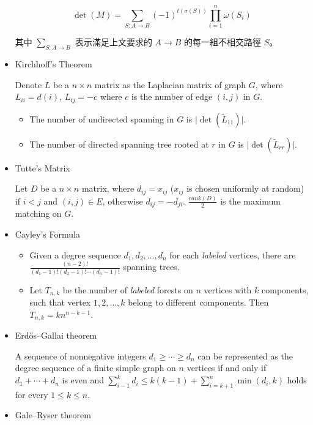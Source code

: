 \begin{itemize}
$$
\det(M)=\sum\limits_{S:A\rightarrow B}(-1)^{t(\sigma(S))}\prod\limits_{i=1}^n \omega(S_i)
$$

其中 $\sum\limits_{S:A\rightarrow B}$ 表示滿足上文要求的 $A\rightarrow B$ 的每一組不相交路徑 $S$。

\item Kirchhoff's Theorem

Denote $L$ be a $n \times n$ matrix as the Laplacian matrix of graph $G$, where $L_{ii} = d(i)$, $L_{ij} = -c$ where $c$ is the number of edge $(i, j)$ in $G$.
\begin{itemize}
    \itemsep-0.5em
    \item The number of undirected spanning in $G$ is $\lvert \det(\tilde{L}_{11}) \rvert$.
    \item The number of directed spanning tree rooted at $r$ in $G$ is $\lvert \det(\tilde{L}_{rr}) \rvert$.
\end{itemize}

\item Tutte's Matrix

Let $D$ be a $n \times n$ matrix, where $d_{ij} = x_{ij}$ ($x_{ij}$ is chosen uniformly at random) if $i < j$ and $(i, j) \in E$, otherwise $d_{ij} = -d_{ji}$. $\frac{rank(D)}{2}$ is the maximum matching on $G$.

\item Cayley's Formula

\begin{itemize}
    \itemsep-0.5em
  \item Given a degree sequence $d_1, d_2, \ldots, d_n$ for each \textit{labeled} vertices, there are $\frac{(n - 2)!}{(d_1 - 1)!(d_2 - 1)!\cdots(d_n - 1)!}$ spanning trees.
  \item Let $T_{n, k}$ be the number of \textit{labeled} forests on $n$ vertices with $k$ components, such that vertex $1, 2, \ldots, k$ belong to different components. Then $T_{n, k} = kn^{n - k - 1}$.
\end{itemize}

\item Erdős–Gallai theorem 

A sequence of nonnegative integers $d_1\ge\cdots\ge d_n$ can be represented as the degree sequence of a finite simple graph on $n$ vertices if and only if $d_1+\cdots+d_n$ is even and $\displaystyle\sum_{i-1}^kd_i\le k(k-1)+\displaystyle\sum_{i=k+1}^n\min(d_i,k)$ holds for every $1\le k\le n$.

\item Gale–Ryser theorem


\end{itemize}
